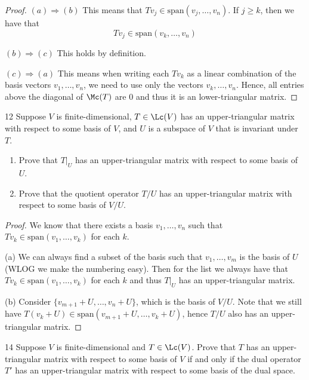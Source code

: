 \documentclass{extarticle}
\begin{document}
\begin{proof}
\((a) \Rightarrow (b)\) This means that \(Tv_j \in \text{span}(v_j, \ldots, v_n)\). If \(j \geq k\), then 
we have that 
\[T v_j \in \text{span}(v_k, \ldots, v_n)\]

\((b) \Rightarrow (c)\) This holds by definition. 

\((c) \Rightarrow (a)\) This means when writing each \(Tv_k\) as a linear combination of the basis vectors 
\(v_1, \ldots, v_n\), we need to use only the vectors \(v_k, \ldots, v_n\). Hence, all entries above the 
diagonal of \(\Mc(T)\) are 0 and thus it is an lower-triangular matrix.
\end{proof}

\begin{problem}{12}
    Suppose \(V\) is finite-dimensional, \(T \in \Lc(V)\) has an upper-triangular matrix with respect 
    to some basis of \(V\), and \(U\) is a subspace of \(V\) that is invariant under \(T\). 
    \begin{enumerate}[label=(\alph*)]
        \item Prove that \(T|_U\) has an upper-triangular matrix with respect to some basis of \(U\). 
        \item Prove that the quotient operator \(T/U\) has an upper-triangular matrix with respect 
        to some basis of \(V/U\).
    \end{enumerate}
\end{problem}

\begin{proof} We know that there exists a basis \(v_1, \ldots, v_n\) 
    such that \(T v_k \in \text{span}(v_1, \ldots, v_k)\) for each \(k\). 

(a) We can always find a subset of the basis such that \(v_1, \ldots, v_m\) is the basis of 
\(U\) (WLOG we make the numbering easy). Then for the list we always have that \(T v_k \in 
\text{span}(v_1, \ldots, v_k)\) for each \(k\) and thus \(T|_U\) has an upper-triangular matrix. 

(b) Consider \(\{v_{m+1} + U, \ldots, v_n + U\}\), which is the basis of \(V/U\). Note that 
we still have \(T(v_k + U) \in \text{span}(v_{m+1} + U, \ldots, v_{k} +U)\), hence \(T/U\) 
also has an upper-triangular matrix. 
\end{proof}

\begin{problem}{14}
    Suppose \(V\) is finite-dimensional and \(T \in \Lc(V)\). Prove that \(T\) has an upper-triangular 
    matrix with respect to some basis of \(V\) if and only if the dual operator \(T'\) has an upper-triangular 
    matrix with respect to some basis of the dual space. 
\end{problem}
\end{document}
